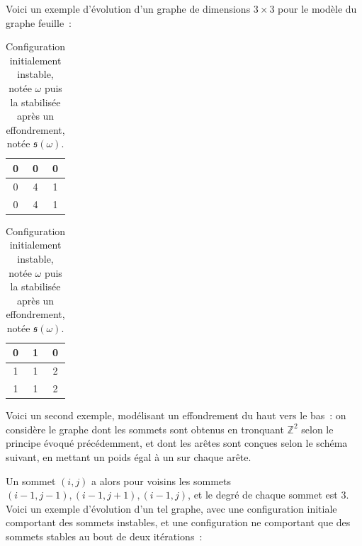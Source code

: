 \documentclass{article}
\begin{document}
Voici un exemple d'évolution d'un graphe de dimensions $3\times3$ pour le modèle du graphe feuille :
\begin{table}[htb]
    \hfill
    \begin{tabular}{c|c|c}
        0 & 0 & 0\tabularnewline
        \hline
        0 & 4 & 1\tabularnewline
        \hline
        0 & 4 & 1
    \end{tabular}
    \hfill
    \begin{tabular}{c|c|c}
        0 & 1 & 0\tabularnewline
        \hline
        1 & 1 & 2\tabularnewline
        \hline
        1 & 1 & 2
    \end{tabular}
    \hfill\null
    \caption{Configuration initialement instable, notée $\omega$ puis la stabilisée après un effondrement, notée $\mathfrak{s}(\omega)$.}
    \label{uca}
\end{table}

Voici un second exemple, modélisant un effondrement du haut vers le bas : on considère le graphe dont les sommets sont obtenus en tronquant $\mathbb{Z}^2$ selon le principe évoqué précédemment, et dont les arêtes sont conçues selon le schéma suivant, en mettant un poids égal à un sur chaque arête.
\begin{center}  
\end{center}

Un sommet $(i,j)$ a alors pour voisins les sommets $(i-1,j-1), (i-1,j+1), (i-1,j)$, et le degré de chaque sommet est $3$.
Voici un exemple d'évolution d'un tel graphe, avec une configuration initiale comportant des sommets instables, et une configuration ne comportant que des sommets stables au bout de deux itérations :
\end{document}
